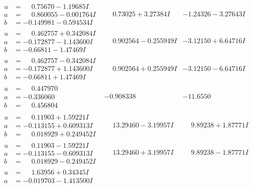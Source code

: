 \documentclass[1p]{elsarticle_modified}
\theoremstyle{definition}
\begin{document}
$$\begin{array}{c|c|c}
\begin{aligned}
u &= \phantom{-}0.75670 - 1.19685 I \\
a &= \phantom{-}0.860055 - 0.001764 I \\
b &= -0.149981 - 0.594534 I\end{aligned}
 & \phantom{-}0.73025 + 3.27384 I & -1.24326 - 3.27643 I \\ \hline\begin{aligned}
u &= \phantom{-}0.462757 + 0.342084 I \\
a &= -0.172877 - 1.143600 I \\
b &= -0.66811 - 1.47469 I\end{aligned}
 & \phantom{-}0.902564 - 0.255949 I & -3.12150 + 6.64716 I \\ \hline\begin{aligned}
u &= \phantom{-}0.462757 - 0.342084 I \\
a &= -0.172877 + 1.143600 I \\
b &= -0.66811 + 1.47469 I\end{aligned}
 & \phantom{-}0.902564 + 0.255949 I & -3.12150 - 6.64716 I \\ \hline\begin{aligned}
u &= \phantom{-}0.447970\phantom{ +0.000000I} \\
a &= -0.336060\phantom{ +0.000000I} \\
b &= \phantom{-}0.456804\phantom{ +0.000000I}\end{aligned}
 & -0.908338\phantom{ +0.000000I} & -11.6550\phantom{ +0.000000I} \\ \hline\begin{aligned}
u &= \phantom{-}0.11903 + 1.59221 I \\
a &= -0.113155 + 0.609313 I \\
b &= \phantom{-}0.018929 + 0.249452 I\end{aligned}
 & \phantom{-}13.29460 - 3.19957 I & \phantom{-}9.89238 + 1.87771 I \\ \hline\begin{aligned}
u &= \phantom{-}0.11903 - 1.59221 I \\
a &= -0.113155 - 0.609313 I \\
b &= \phantom{-}0.018929 - 0.249452 I\end{aligned}
 & \phantom{-}13.29460 + 3.19957 I & \phantom{-}9.89238 - 1.87771 I \\ \hline\begin{aligned}
u &= \phantom{-}1.63956 + 0.34345 I \\
a &= -0.019703 - 1.413500 I \\

\end{aligned}
\end{array}$$
\end{document}
